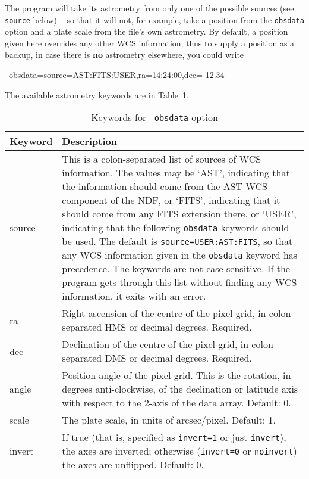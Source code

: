 \documentclass[twoside,11pt,nolof]{starlink}
\begin{document}
The program will take its astrometry from only one of the possible sources
(see \texttt{source} below) -- so that it will not, for example, take a
position from the \texttt{obsdata} option and a plate scale from the file's
own astrometry.  By default, a position given here overrides any other WCS
information; thus to supply a position as a backup, in case there is
\textbf{no} astrometry elsewhere, you could write
\begin{terminalv}
--obsdata=source=AST:FITS:USER,ra=14:24:00,dec=-12.34
\end{terminalv}
The available astrometry keywords are in Table~\ref{tab:obsdata}.

\begin{table}
\begin{center}
\begin{tabular}{l|p{10cm}}
Keyword & Description \\ \hline
source & This is a colon-separated list of sources of WCS information. The
values may be `AST', indicating that the information should come from the AST
WCS component of the NDF, or `FITS', indicating that it should come from any
FITS extension there, or `USER', indicating that the following
\texttt{obsdata} keywords should be used. The default is
\texttt{source=USER:AST:FITS}, so that any WCS information given in the
\texttt{obsdata} keyword has precedence. The keywords are not
case-sensitive. If the program gets through this list without finding any WCS
information, it exits with an error.\\
ra & Right ascension of the centre of the pixel grid, in colon-separated HMS
or decimal degrees. Required.\\
dec & Declination of the centre of the pixel grid, in colon-separated DMS or
decimal degrees. Required.\\
angle & Position angle of the pixel grid. This is the rotation, in degrees
anti-clockwise, of the declination or latitude axis with respect to the 2-axis
of the data array. Default: 0.\\
scale & The plate scale, in units of arcsec/pixel. Default: 1.\\
invert & If true (that is, specified as \texttt{invert=1} or just
\texttt{invert}), the axes are inverted; otherwise (\texttt{invert=0} or
\texttt{noinvert}) the axes are unflipped. Default: 0.
\end{tabular}
\end{center}
\caption{\label{tab:obsdata}Keywords for \texttt{--obsdata} option}
\end{table}
\end{document}

